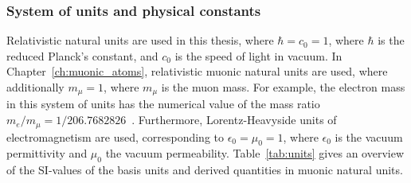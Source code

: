 \subsubsection*{System of units and physical constants}
Relativistic natural units are used in this thesis, where $\hbar=c_0=1$, where $\hbar$ is the reduced Planck's constant, and $c_0$ is the speed of light in vacuum. In Chapter~\ref{ch:muonic_atoms}, relativistic muonic natural units are used, where additionally $m_\mu=1$, where $m_\mu$ is the muon mass. For example, the electron mass in this system of units has the numerical value of the mass ratio $m_e/m_\mu = 1/206.768 2826$~\cite{codata}.
Furthermore, Lorentz-Heavyside units of electromagnetism are used, corresponding to $\epsilon_0=\mu_0=1$, where $\epsilon_0$ is the vacuum permittivity and $\mu_0$ the vacuum permeability.
Table~\ref{tab:units} gives an overview of the SI-values of the basis units and derived quantities in muonic natural units.\\[1.5cm]

